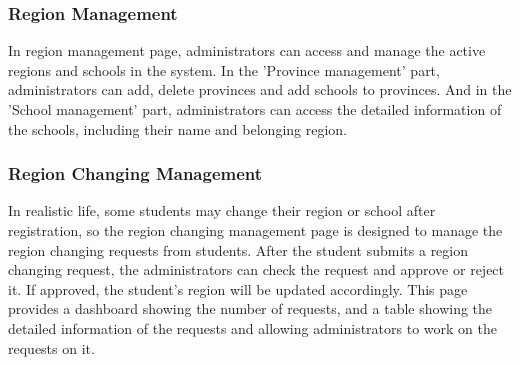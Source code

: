 \documentclass[12pt]{article}
\begin{document}
\subsubsection{Region Management}
In region management page, administrators can access and manage the active regions and schools in the system. In the 'Province management'
part, administrators can add, delete provinces and add schools to provinces. And in the 'School management' part, administrators can
access the detailed information of the schools, including their name and belonging region.
\subsubsection{Region Changing Management}
In realistic life, some students may change their region or school after registration, so the region changing management page is designed to
manage the region changing requests from students. After the student submits a region changing request,
the administrators can check the request and approve or reject it. If approved, the student's region will be updated accordingly.
This page provides a dashboard showing the number of requests, and a table showing the detailed information of the requests
and allowing administrators to work on the requests on it.
\end{document}
